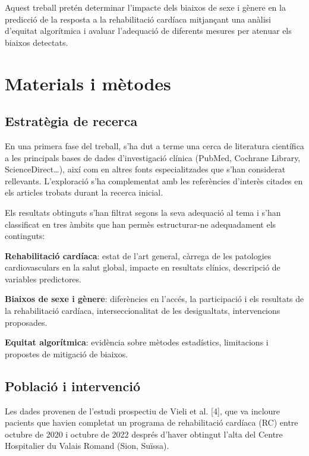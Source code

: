 \documentclass[CAT]{TFUOC}%
\begin{document}
Aquest treball pretén determinar l'impacte dels biaixos de sexe i gènere en la predicció de la resposta a la rehabilitació cardíaca mitjançant una anàlisi d'equitat algorítmica i avaluar l'adequació de diferents mesures per atenuar els biaixos detectats.

\chapter{Materials i mètodes}\label{materials-i-muxe8todes}

\section{Estratègia de recerca}\label{estratuxe8gia-de-recerca}

En una primera fase del treball, s'ha dut a terme una cerca de literatura científica a les principals bases de dades d'investigació clínica (PubMed, Cochrane Library, ScienceDirect\ldots), així com en altres fonts especialitzades que s'han considerat rellevants. L'exploració s'ha complementat amb les referències d'interès citades en els articles trobats durant la recerca inicial.

Els resultats obtinguts s'han filtrat segons la seva adequació al tema i s'han classificat en tres àmbits que han permès estructurar-ne adequadament els continguts:

\bigskip

\textbf{Rehabilitació cardíaca}: estat de l'art general, càrrega de les patologies cardiovasculars en la salut global, impacte en resultats clínics, descripció de variables predictores.

\textbf{Biaixos de sexe i gènere}: diferències en l'accés, la participació i els resultats de la rehabilitació cardíaca, interseccionalitat de les desigualtats, intervencions proposades.

\textbf{Equitat algorítmica}: evidència sobre mètodes estadístics, limitacions i propostes de mitigació de biaixos.

\section{Població i intervenció}\label{poblaciuxf3-i-intervenciuxf3}

Les dades provenen de l'estudi prospectiu de Vieli et al. {[}4{]}, que va incloure pacients que havien completat un programa de rehabilitació cardíaca (RC) entre octubre de 2020 i octubre de 2022 després d'haver obtingut l'alta del Centre Hospitalier du Valais Romand (Sion, Suïssa).
\end{document}
